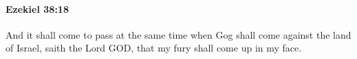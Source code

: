 
		\paragraph{Ezekiel 38:18} %
			\label{EZEKIEL-38-18}

			And it shall come to pass at the same time when Gog shall come against the land of Israel, saith the Lord GOD, that my fury shall come up in my face.


